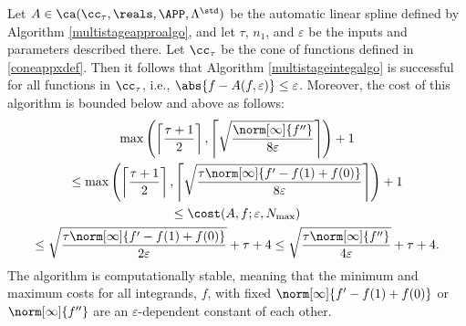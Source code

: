 \begin{theorem} \label{multistageappxthm} Let $A \in \ca(\cc_{\tau}, \reals, \APP, \Lambda^{\std})$ be the automatic linear spline defined by Algorithm \ref{multistageapproalgo}, and let $\tau$, $n_1$, and $\varepsilon$ be the inputs and parameters described there. Let $\cc_\tau$ be the cone of functions defined in \eqref{coneappxdef}.  Then it follows that Algorithm \ref{multistageintegalgo} is successful for all functions in $\cc_{\tau}$,  i.e.,  $\abs{f - A(f,\varepsilon)} \le \varepsilon$.  Moreover, the cost of this algorithm is bounded below and above as follows:
\begin{multline}
\max \left(\left \lceil\frac{\tau+1}{2} \right \rceil, \left \lceil \sqrt{\frac{ \norm[\infty]{f''}}{8\varepsilon}} \right \rceil \right) +1 \\
\le \max \left(\left \lceil\frac{\tau+1}{2} \right \rceil, \left \lceil \sqrt{\frac{\tau \norm[\infty]{f'-f(1)+f(0)}}{8\varepsilon}} \right \rceil \right) +1 \\
\le 
\cost(A,f;\varepsilon,N_{\max}) \\
\le \sqrt{\frac{\tau \norm[\infty]{f'-f(1)+f(0)}}{2\varepsilon}} + \tau + 4 
\le \sqrt{\frac{\tau \norm[\infty]{f''} }{4\varepsilon}} + \tau + 4.
\end{multline}
The algorithm is computationally stable, meaning that the minimum and maximum costs for all integrands, $f$, with fixed $\norm[\infty]{f'-f(1)+f(0)}$ or $\norm[\infty]{f''}$ are an $\varepsilon$-dependent constant of each other.
\end{theorem}

